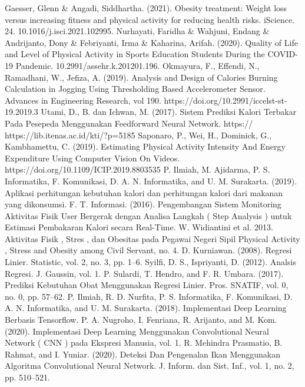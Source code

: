 \documentclass[12pt,twoside]{report}
\begin{document}
\begin{thebibliography}{}
    Gaesser, Glenn \& Angadi, Siddhartha. (2021). Obesity treatment: Weight loss versus increasing fitness and physical activity for reducing health risks. iScience. 24. 10.1016/j.isci.2021.102995.
    Nurhayati, Faridha \& Wahjuni, Endang \& Andrijanto, Dony \& Febriyanti, Irma \& Kaharina, Arifah. (2020). Quality of Life and Level of Physical Activity in Sports Education Students During the COVID-19 Pandemic. 10.2991/assehr.k.201201.196.
    Okmayura, F., Effendi, N., Ramadhani, W., Jefiza, A. (2019). Analysis and Design of Calories Burning Calculation in Jogging Using Thresholding Based Accelerometer Sensor. Advances in Engineering Research, vol 190. https://doi.org/10.2991/iccelst-st-19.2019.3
    Utami, D., B. dan Ichwan, M. (2017). Sistem Prediksi Kalori Terbakar Pada Pesepeda Menggunakan Feedforward Neural Network. https:// https://lib.itenas.ac.id/kti/?p=5185
    Saponaro, P., Wei, H., Dominick, G., Kambhamettu, C. (2019). Estimating Physical Activity Intensity And Energy Expenditure Using Computer Vision On Videos. https://doi.org/10.1109/ICIP.2019.8803535
    P. Ilmiah, M. Ajidarma, P. S. Informatika, F. Komunikasi, D. A. N. Informatika, and U. M. Surakarta. (2019). Aplikasi perhitungan kebutuhan kalori dan perhitungan kalori dari makanan yang dikonsumsi.
    F. T. Informasi. (2016). Pengembangan Sistem Monitoring Aktivitas Fisik User Bergerak dengan Analisa Langkah ( Step Analysis ) untuk Estimasi Pembakaran Kalori secara Real-Time.
    W. Widiantini et al. 2013. Aktivitas Fisik , Stres , dan Obesitas pada Pegawai Negeri Sipil Physical Activity , Stress and Obesity among Civil Servant, no. 4.
    D. Kurniawan. (2008). Regresi Linier. Statistic, vol. 2, no. 3, pp. 1–6.
    Syilfi, D. S., Ispriyanti, D. (2012). Analsis Regresi. J. Gaussin, vol. 1.
    P. Sulardi, T. Hendro, and F. R. Umbara. (2017). Prediksi Kebutuhan Obat Menggunakan Regresi Linier. Pros. SNATIF, vol. 0, no. 0, pp. 57–62.
    P. Ilmiah, R. D. Nurfita, P. S. Informatika, F. Komunikasi, D. A. N. Informatika, and U. M. Surakarta. (2018). Implementasi Deep Learning Berbasis Tensorflow.
    P. A. Nugroho, I. Fenriana, R. Arijanto, and M. Kom. (2020). Implementasi Deep Learning Menggunakan Convolutional Neural Network ( CNN ) pada Ekspresi Manusia, vol. 1.
    R. Mehindra Prasmatio, B. Rahmat, and I. Yuniar. (2020). Deteksi Dan Pengenalan Ikan Menggunakan Algoritma Convolutional Neural Network.  J. Inform. dan Sist. Inf., vol. 1, no. 2, pp. 510–521.

\end{thebibliography}
\end{document}
